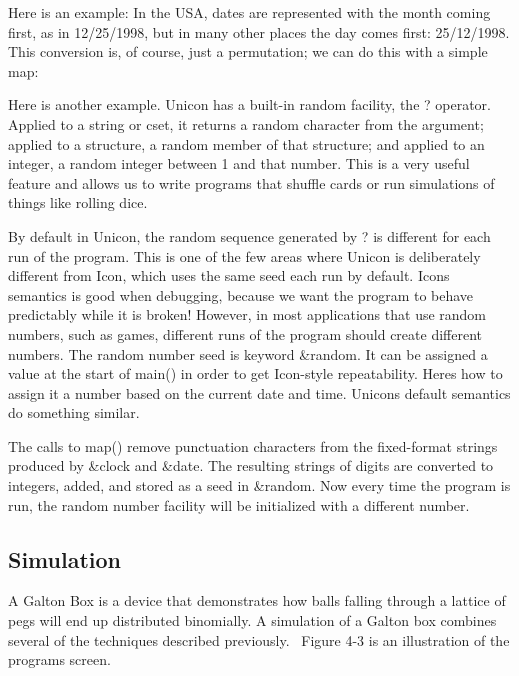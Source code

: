 \bigskip

Here is an example: In the USA, dates are represented with the month
coming first, as in 12/25/1998, but in many other places the day comes
first: 25/12/1998. This conversion is, of course, just a permutation;
we can do this with a simple map:


Here is another example. Unicon has a built-in random facility, the
\textsf{?} operator. Applied to a string or cset, it returns a random
character from the argument; applied to a structure, a random member of
that structure; and applied to an integer, a random integer between 1
and that number. This is a very useful feature and allows us to write
programs that shuffle cards or run simulations of things like rolling
dice.

By default in Unicon, the random sequence generated by \textsf{?} is
different for each run of the program. This is one of the few areas
where Unicon is deliberately different from Icon, which uses the same
seed each run by default. Icon{\textquotesingle}s semantics is good
when debugging, because we want the program to behave predictably while
it is broken! However, in most applications that use random numbers,
such as games, different runs of the program should create different
numbers. The random number seed is keyword
\textsf{\&random.} It can be assigned a value at the start of main() in
order to get Icon-style repeatability. Here{\textquotesingle}s how to
assign it a number based on the current date and time.
Unicon{\textquotesingle}s default semantics do something similar.


The calls to \textsf{map()} remove punctuation characters from the
fixed-format strings produced by \textsf{\&clock} and \textsf{\&date}.
The resulting strings of digits are converted to integers, added, and
stored as a seed in \textsf{\&random}. Now every time the program is
run, the random number facility will be initialized with a different
number.

\subsection{Simulation}
A Galton Box is a device that demonstrates how balls falling through a
lattice of pegs will end up distributed binomially. A simulation of a
Galton box combines several of the techniques described previously.
\ Figure 4-3 is an illustration of the program{\textquotesingle}s
screen.



